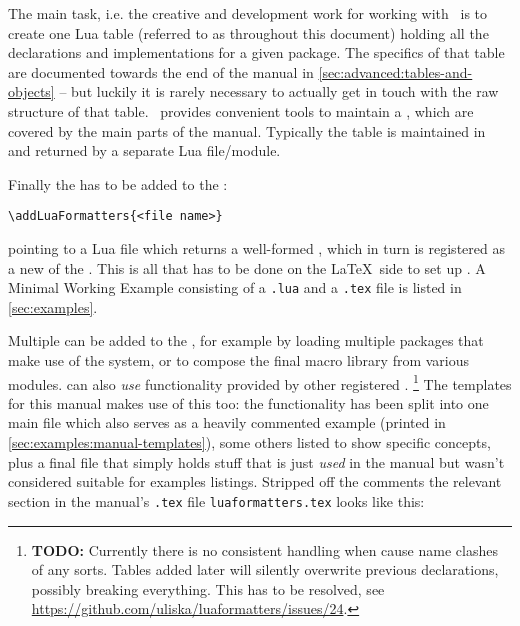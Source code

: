 \documentclass[12pt]{scrartcl}
\begin{document}
The main task, i.e. the creative and development work for working with
\luaformatters\ is to create one Lua table (referred to as
 throughout this document) holding all the declarations
and implementations for a given package.  The specifics of that table are
documented towards the end of the manual in
\vref{sec:advanced:tables-and-objects} -- but luckily it is rarely
necessary to actually get in touch with the raw structure of that table.
\luaformatters\ provides convenient tools to maintain a , which are covered by the main parts of the manual. Typically the table
is maintained in and returned by a separate Lua file/module.

\medskip

Finally the  has to be added to the :

\begin{verbatim}
\addLuaFormatters{<file name>}
\end{verbatim}

\noindent pointing to a Lua file which returns a well-formed , which in turn is registered as a new  of the
. This is all that has to be done on the \LaTeX\ side to
set up \luaformatters. A Minimal Working Example consisting of a
\texttt{.lua} and a \texttt{.tex} file is listed in \vref{sec:examples}.

Multiple  can be added to the
, for example by loading multiple packages that make use
of the system, or to compose the final macro library from various modules.
 can also \emph{use} functionality
provided by other registered .%
\footnote{\textbf{TODO:} Currently there is no consistent handling when
 cause name clashes of any sorts. Tables
added later will silently overwrite previous declarations, possibly breaking
everything. This has to be resolved, see
\url{https://github.com/uliska/luaformatters/issues/24}.} %
The templates for this manual makes use of this too: the functionality has been
split into one main file which also serves as a heavily commented example
(printed in \vref{sec:examples:manual-templates}), some others listed to show
specific concepts, plus a final file that simply holds stuff that is just
\emph{used} in the manual but wasn't considered suitable for examples listings.
Stripped off the comments the relevant section in the manual's \texttt{.tex}
file \texttt{luaformatters.tex} looks like this:
\end{document}
